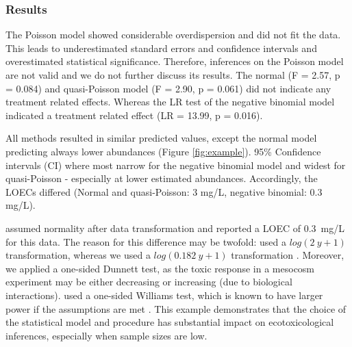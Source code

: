\documentclass{scrartcl}
\begin{document}
\subsubsection{Results}
The Poisson model showed considerable overdispersion and did not fit the data. 
This leads to underestimated standard errors and confidence intervals and overestimated statistical significance.
Therefore, inferences on the Poisson model are not valid and we do not further discuss its results.
The normal (F = 2.57, p = 0.084) and quasi-Poisson model (F = 2.90, p = 0.061) did not indicate any treatment related effects.
Whereas the LR test of the negative binomial model indicated a treatment related effect (LR = 13.99, p = 0.016).

All methods resulted in similar predicted values, except the normal model predicting always lower abundances (Figure \ref{fig:example}). 
95\% Confidence intervals (CI) where most narrow for the negative binomial model and widest for quasi-Poisson - especially at lower estimated abundances.
Accordingly, the LOECs differed (Normal and quasi-Poisson: 3 mg/L, negative binomial: 0.3 mg/L).

\citet{brock_minimum_2015} assumed normality after data transformation and reported a LOEC of \mbox{0.3 mg/L} for this data.
The reason for this difference may be twofold: \citep{brock_minimum_2015} used a $log(2~y + 1)$ transformation, whereas we used a $log(0.182~y + 1)$ transformation \citep{van_den_brink_impact_2000}.
Moreover, we applied a one-sided Dunnett test, as the toxic response in a mesocosm experiment may be either decreasing or increasing (due to biological interactions).
\citet{brock_minimum_2015} used a one-sided Williams test, which is known to have larger power if the assumptions are met \citep{jaki_statistical_2013}.
This example demonstrates that the choice of the statistical model and procedure has substantial impact on ecotoxicological inferences, especially when sample sizes are low.
\end{document}
